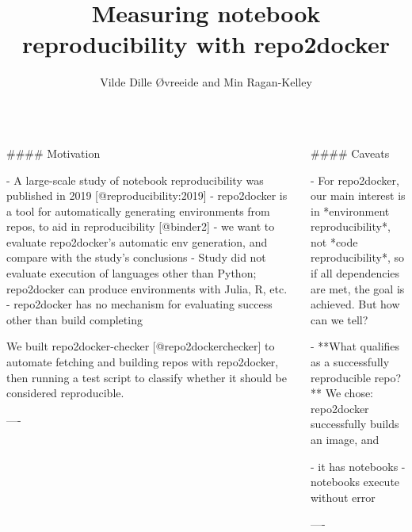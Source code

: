 \documentclass{beamer}
\author[]{Vilde Dille Øvreeide and Min Ragan-Kelley}
\institute[simula]{Simula Research Laboratory}
\title{Measuring notebook reproducibility with repo2docker}
\begin{document}
\begin{frame}[fragile]\centering

\begin{columns}
\begin{column}{0.57\textwidth}

\begin{markdown}

#### Motivation


- A large-scale study of notebook reproducibility was published in 2019 [@reproducibility:2019]
- repo2docker is a tool for automatically generating environments from repos, to aid in reproducibility [@binder2]
- we want to evaluate repo2docker's automatic env generation,
  and compare with the study's conclusions
- Study did not evaluate execution of languages other than Python;
  repo2docker can produce environments with Julia, R, etc.
- repo2docker has no mechanism for evaluating success other than build completing

We built repo2docker-checker [@repo2dockerchecker] to automate
fetching and building repos with repo2docker, then running a test script
to classify whether it should be considered reproducible.


----
\end{markdown}
\end{column}

\begin{column}{.4\textwidth}
\begin{markdown}


#### Caveats

- For repo2docker, our main interest is in *environment reproducibility*,
  not *code reproducibility*,
  so if all dependencies are met, the goal is achieved.
  But how can we tell?

- **What qualifies as a successfully reproducible repo?**
  We chose: repo2docker successfully builds an image, and

    - it has notebooks
    - notebooks execute without error

----

\end{markdown}
\end{column}

\end{columns}

\bigskip
{\hrulefill}
\bigskip

\begin{columns}[T]

\begin{column}{.46\textwidth}


\end{column}
\end{columns}
\end{frame}
\end{document}
